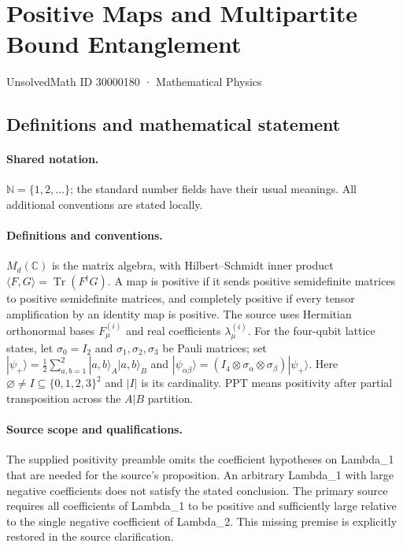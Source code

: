 \documentclass[11pt]{article}
\begin{document}
\setcounter{section}{30000179}
\section{Positive Maps and Multipartite Bound Entanglement}\label{30000180}
{\small UnsolvedMath ID 30000180 · Mathematical Physics}
\subsection{Definitions and mathematical statement}

\paragraph{Shared notation.}$\mathbb N=\{1,2,\ldots\}$; the standard number fields have their usual meanings. All additional conventions are stated locally.


\paragraph{Definitions and conventions.} $M_d(\mathbb C)$ is the matrix algebra, with Hilbert--Schmidt inner product $\langle F,G\rangle=\operatorname{Tr}(F^\dagger G)$. A map is positive if it sends positive semidefinite matrices to positive semidefinite matrices, and completely positive if every tensor amplification by an identity map is positive. The source uses Hermitian orthonormal bases $F^{(i)}_\mu$ and real coefficients $\lambda^{(i)}_\mu$. For the four-qubit lattice states, let $\sigma_0=I_2$ and $\sigma_1,\sigma_2,\sigma_3$ be Pauli matrices; set $|\psi_+\rangle=\tfrac12\sum_{a,b=1}^2|a,b\rangle_A|a,b\rangle_B$ and $|\psi_{\alpha\beta}\rangle=(I_4\otimes\sigma_\alpha\otimes\sigma_\beta)|\psi_+\rangle$. Here $\varnothing\ne I\subseteq\{0,1,2,3\}^2$ and $|I|$ is its cardinality. PPT means positivity after partial transposition across the $A|B$ partition.

\paragraph{Source scope and qualifications.} The supplied positivity preamble omits the coefficient hypotheses on Lambda\_1 that are needed for the source's proposition. An arbitrary Lambda\_1 with large negative coefficients does not satisfy the stated conclusion. The primary source requires all coefficients of Lambda\_1 to be positive and sufficiently large relative to the single negative coefficient of Lambda\_2. This missing premise is explicitly restored in the source clarification.
\end{document}
